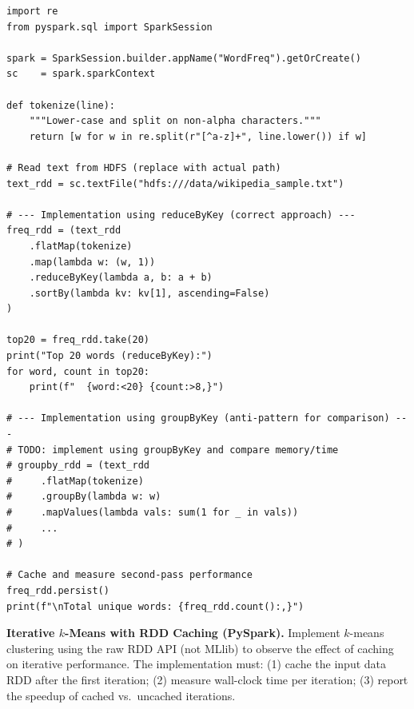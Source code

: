\begin{lstlisting}[style=pyspark, caption={PE6.1: Word frequency with RDD API}]
import re
from pyspark.sql import SparkSession

spark = SparkSession.builder.appName("WordFreq").getOrCreate()
sc    = spark.sparkContext

def tokenize(line):
    """Lower-case and split on non-alpha characters."""
    return [w for w in re.split(r"[^a-z]+", line.lower()) if w]

# Read text from HDFS (replace with actual path)
text_rdd = sc.textFile("hdfs:///data/wikipedia_sample.txt")

# --- Implementation using reduceByKey (correct approach) ---
freq_rdd = (text_rdd
    .flatMap(tokenize)
    .map(lambda w: (w, 1))
    .reduceByKey(lambda a, b: a + b)
    .sortBy(lambda kv: kv[1], ascending=False)
)

top20 = freq_rdd.take(20)
print("Top 20 words (reduceByKey):")
for word, count in top20:
    print(f"  {word:<20} {count:>8,}")

# --- Implementation using groupByKey (anti-pattern for comparison) ---
# TODO: implement using groupByKey and compare memory/time
# groupby_rdd = (text_rdd
#     .flatMap(tokenize)
#     .groupBy(lambda w: w)
#     .mapValues(lambda vals: sum(1 for _ in vals))
#     ...
# )

# Cache and measure second-pass performance
freq_rdd.persist()
print(f"\nTotal unique words: {freq_rdd.count():,}")
\end{lstlisting}

\pe \textbf{Iterative $k$-Means with RDD Caching (PySpark).}
Implement $k$-means clustering using the raw RDD API (not MLlib) to
observe the effect of caching on iterative performance. The implementation
must: (1) cache the input data RDD after the first iteration; (2) measure
wall-clock time per iteration; (3) report the speedup of cached vs.\
uncached iterations.

